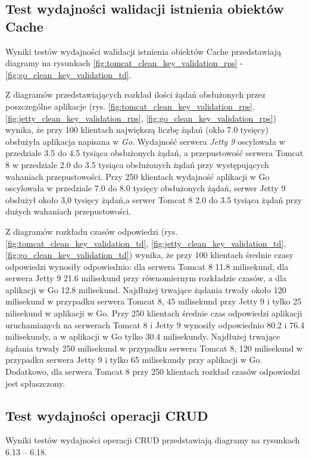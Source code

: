 
\clearpage

\subsection{Test wydajności walidacji istnienia obiektów Cache}
Wyniki testów wydajności walidacji istnienia obiektów Cache przedstawiają diagramy na rysunkach \ref{fig:tomcat_clean_key_validation_rps} - \ref{fig:go_clean_key_validation_td}.              

Z diagramów przedstawiających rozkład ilości żądań obsłużonych przez poszczególne aplikacje  (rys. \ref{fig:tomcat_clean_key_validation_rps}, \ref{fig:jetty_clean_key_validation_rps}, \ref{fig:go_clean_key_validation_rps}) wynika, że przy 100 klientach największą liczbę żądań (okło 7.0 tysięcy) obsłużyła aplikacja napisana w \textsl{Go}. Wydajność serwera \textsl{Jetty 9} oscylowała w przedziale 3.5 do 4.5 tysiąca obsłużonych żądań, a przepustowość serwera Tomcat 8 w przedziale 2.0 do 3.5 tysiąca obsłużonych żądań przy występujących wahaniach przepustowości. Przy 250 klientach wydajność aplikacji w Go oscylowała w przedziale 7.0 do 8.0 tysięcy obsłużonych żądań, serwer Jetty 9 obsłużył około 3,0 tysięcy żądań,a serwer Tomcat 8  2.0 do 3.5 tysiąca żądań przy dużych wahaniach przepustowości.


Z diagramów rozkładu czasów odpowiedzi (rys. \ref{fig:tomcat_clean_key_validation_td}, \ref{fig:jetty_clean_key_validation_td}, \ref{fig:go_clean_key_validation_td}) wynika, że przy 100 klientach średnie czasy odpowiedzi wynosiły odpowiednio: dla serwera Tomcat 8 11.8 milisekund, dla serwera Jetty 9 21.6 milisekund przy równomiernym rozkładzie czasów, a dla aplikacji w Go 12.8 milisekund. Najdłużej trwające żądania trwały około 120 milisekund w przypadku serwera Tomcat 8, 45 milisekund przy  Jetty 9 i tylko 25 nilisekund w aplikacji w Go. Przy 250 klientach średnie czas odpowiedzi aplikacji uruchamianych na serwerach Tomcat 8 i Jetty 9  wynosiły  odpowiednio 80.2 i 76.4 milisekundy, a w aplikacji w Go tylko 30.4 milisekundy. Najdłużej trwające żądania trwały 250 milisekund w przypadku serwera Tomcat 8, 120 milisekund w przypadku serwera Jetty 9 i tylko 65 milisekundy przy aplikacji w Go. Dodatkowo, dla serwera Tomcat 8 przy 250 klientach  rozkład czasów odpowiedzi jest spłaszczony. 


\clearpage

\subsection{Test wydajności operacji CRUD}
Wyniki testów wydajności operacji CRUD przedstawiają diagramy na rysunkach 6.13 – 6.18.

